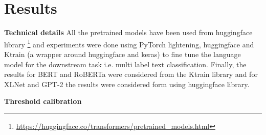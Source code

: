 \chapter{Results}

\textbf{Technical details}
All the pretrained models have been used from huggingface library \footnote{\url{https://huggingface.co/transformers/pretrained_models.html}} and experiments were done using PyTorch lightening, huggingface and Ktrain (a wrapper around huggingface and keras) to fine tune the language model for the downstream task i.e. multi label text classification. Finally, the results for BERT and RoBERTa were considered from the Ktrain library and for XLNet and GPT-2 the results were considered form using huggingface library.

\textbf{Threshold calibration}

\pagebreak
\begin{table}[]
\caption{Sample average results of Language models}
\label{tab:sample_avg_LM}
\end{table}


